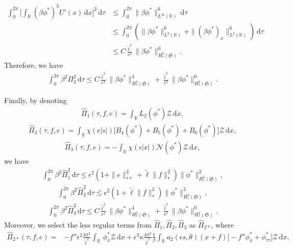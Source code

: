 \documentclass[10pt, reqno]{amsart}
\numberwithin{equation}{section}
\theoremstyle{definition}
\begin{document}
{\begin{align*}
\int_0^{2\pi} \Bigg[\int_{{\mathbb R}} \left(\beta\phi^* \right)^3U'(x)\,{\mathrm d}x\Bigg]^2 \,{\mathrm d}\tau
&\leq \int_0^{2\pi} \|\beta\phi^* \|_{L^{\infty}(\mathbb R)}^6 \,{\mathrm d}\tau
\nonumber\\[2mm]
&\leq \int_0^{2\pi} \left(\|\beta\phi^* \|_{L^{2}(\mathbb R)}^6+\|(\beta\phi^*)_{x} \|_{L^{2}(\mathbb R)}^6\right) \,{\mathrm d}\tau
\nonumber\\[2mm]
&\leq C \frac{{\tilde\ell}^3}{\epsilon^3} \|\beta\phi^*\|^6_{H^2_*(\mathfrak S)}.
\end{align*}
 Therefore, we have
\begin{align*}
 \int_0^{2\pi} \beta^2\Pi_3^2 \,{\mathrm d}\tau \leq C \frac{{\tilde\ell}^2}{\epsilon^2} \|\beta\phi^* \|^4_{H^2_*(\mathfrak S)} + \frac{{\tilde\ell}^3}{\epsilon^3} \|\beta\phi^*\|^6_{H^2_*(\mathfrak S)}.
\end{align*}


\medskip
Finally, by denoting
\begin{align} \label{hatPi1}
\hat\Pi_1(\tau, f, e) = \int_{{\mathbb R}} L_2(\phi^*) {\mathcal Z} \,{\mathrm d}x,
\end{align}
\begin{align} \label{hatPi2}
\hat\Pi_2(\tau, f, e) = \int_{{\mathbb R}} \chi(\epsilon|s|) \big[B_4(\phi^*)+ B_5(\phi^*)+ B_6(\phi^*)\big]{\mathcal Z} \,{\mathrm d}x,
\end{align}
\begin{align} \label{hatPi3}
\hat\Pi_3(\tau, f, e) = -\int_{{\mathbb R}}\chi(\epsilon|x|) {\mathcal N}(\phi^*)\mathcal Z \,{\mathrm d}x,
\end{align}
we have
\begin{align*}
 \int_0^{2\pi} \beta^2 \hat\Pi_1^2 \,{\mathrm d}\tau \leq \epsilon^2\left(1+\|e\|_{**}^2+ {\tilde\ell} \|f\|_*^2\right)\|\phi^*\|_{H^2_*(\mathfrak S)}^2,
\end{align*}
\begin{align*}
 \int_0^{2\pi} \beta^2 \hat\Pi_2^2 \,{\mathrm d}\tau \leq \epsilon^2\left(1 + {\tilde\ell} \|f\|_*^2\right)\|\phi^*\|_{H^2_*(\mathfrak S)}^2,
\end{align*}
\begin{align*}
 \int_0^{2\pi} \beta^2 \hat\Pi_3^2 \,{\mathrm d}\tau
 \leq
C \frac{{\tilde\ell}^2}{\epsilon^2} \|\beta\phi^*\|^4_{H^2_*(\mathfrak S)}
+ \frac{{\tilde\ell}^3}{\epsilon^3} \|\beta\phi^*\|^6_{H^2_*(\mathfrak S)}.
\end{align*}
Moreover, we select the less regular terms from $\hat\Pi_1, \hat\Pi_2, \hat\Pi_3$ as $\hat\Pi_{2*}$, where
\begin{align}\label{hat-Pi2star}
\hat \Pi_{2*}(\tau, f, e)
=& -f''\epsilon^2\frac{4\pi^2}{{\tilde\ell}^2}\int_{\mathbb R}\, \phi^*_x \mathcal Z\,{\mathrm d}x
+ \epsilon^3 \kappa \frac{4\pi^2}{{\tilde\ell}^2}\frac{1}{\beta} \int_{\mathbb R} a_2(\epsilon s, \theta)(x+f)\big[ -f''\phi^*_x +\phi^*_{\tau\tau} \big] \mathcal Z\,{\mathrm d}x.
\end{align}

}
\end{document}

